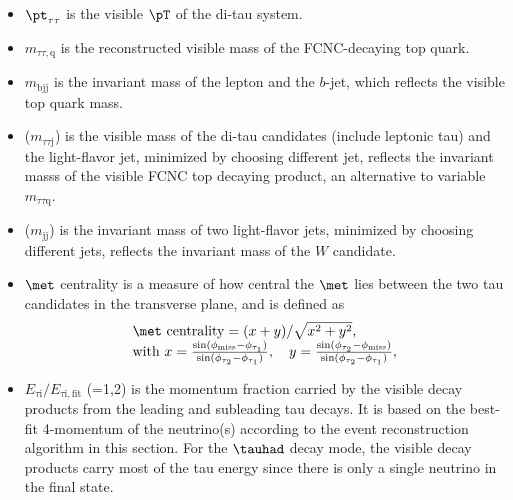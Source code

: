 \documentclass[PAPER, coverpage, atlasdraft=true, texlive=2016, UKenglish]{\ATLASLATEXPATH atlasdoc}
\begin{document}
\begin{itemize}
\item ${\pt}_{\tau\tau}$ is the visible $\pT$ of the di-tau system.
\item $m_{\tau\tau,\text{q}}$ is the reconstructed visible mass of the FCNC-decaying top quark.
\item $m_{\text{bjj}}$ is the invariant mass of the lepton and the $b$-jet, which reflects the visible top quark mass.
\item {}($m_{\tau\tau \text{j}}$) is the visible mass of the di-tau candidates (include leptonic tau) and the light-flavor jet, minimized by choosing different jet, reflects the invariant masss of the visible FCNC top decaying product, an alternative to variable $m_{\tau\tau\text{q}}$.
\item {}($m_{\text{jj}}$) is the invariant mass of two light-flavor jets, minimized by choosing different jets, reflects the invariant mass of the $W$ candidate.
\item $\met$ centrality is a measure of how central the $\met$ lies between the two tau candidates in the transverse plane, and is defined as
\begin{eqnarray}
\begin{array}{l}
\met~\text{centrality} = {(x+y)}/{\sqrt{x^2+y^2}}, \\
\text{with}~x=\frac{\sin(\phi_{\text{miss}}-\phi_{\tau_1})}{\sin(\phi_{\tau_2}-\phi_{\tau_1})}, \quad  y=\frac{\sin(\phi_{\tau_2}-\phi_{\text{miss}})}{\sin(\phi_{\tau_2}-\phi_{\tau_1})} ,
\end{array}
\label{eq:eq3}
\end{eqnarray}
\item $E_{\tau\text{i}}/E_{\tau\text{i},\text{fit}}$ (=1,2) is the momentum fraction carried by the visible decay products from the leading and subleading tau decays. It is based on the best-fit 4-momentum of the neutrino(s) according to the event reconstruction algorithm in this section. For the $\tauhad$ decay mode, the visible decay products carry most of the tau energy since there is only a single neutrino in the final state.%

\end{itemize}
\end{document}
